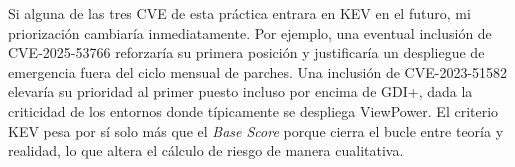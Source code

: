 Si alguna de las tres CVE de esta práctica entrara en KEV en el futuro, mi priorización cambiaría inmediatamente. Por ejemplo, una eventual inclusión de CVE-2025-53766 reforzaría su primera posición y justificaría un despliegue de emergencia fuera del ciclo mensual de parches. Una inclusión de CVE-2023-51582 elevaría su prioridad al primer puesto incluso por encima de GDI+, dada la criticidad de los entornos donde típicamente se despliega ViewPower. El criterio KEV pesa por sí solo más que el \textit{Base Score} porque cierra el bucle entre teoría y realidad, lo que altera el cálculo de riesgo de manera cualitativa.
